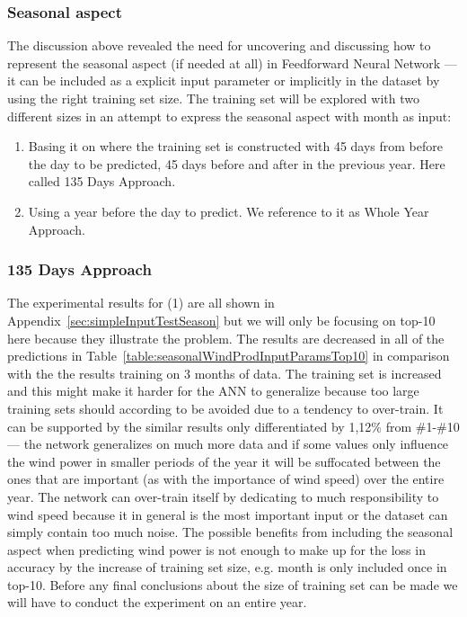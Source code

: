 \subsubsection{Seasonal aspect}
\label{sec:predictionWindProdSeasonalExperiment}
The discussion above revealed the need for uncovering and discussing how to represent the seasonal aspect (if needed at all) in Feedforward Neural Network --- it can be included as a explicit input parameter or implicitly in the dataset by using the right training set size. The training set will be explored with two different sizes in an attempt to express the seasonal aspect with month as input:

\begin{enumerate}
\item Basing it on \cite{pjmForecast} where the training set is constructed with 45 days from before the day to be predicted, 45 days before and after in the previous year. Here called 135 Days Approach.
\item Using a year before the day to predict. We reference to it as Whole Year Approach.
\end{enumerate}

\subsubsection{135 Days Approach}
The experimental results for (1) are all shown in Appendix~\ref{sec:simpleInputTestSeason} but we will only be focusing on top-10 here because they illustrate the problem. The results are decreased in all of the predictions in Table~\ref{table:seasonalWindProdInputParamsTop10} in comparison with the the results training on 3 months of data. The training set is increased and this might make it harder for the ANN to generalize because too large training sets should according to \cite{1} be avoided due to a tendency to over-train. It can be supported by the similar results only differentiated by 1,12\% from \#1-\#10 --- the network generalizes on much more data and if some values only influence the wind power in smaller periods of the year it will be suffocated between the ones that are important (as with the importance of wind speed) over the entire year. The network can over-train itself by dedicating to much responsibility to wind speed because it in general is the most important input or the dataset can simply contain too much noise. The possible benefits from including the seasonal aspect when predicting wind power is not enough to make up for the loss in accuracy by the increase of training set size, e.g. month is only included once in top-10. Before any final conclusions about the size of training set can be made we will have to conduct the experiment on an entire year.

